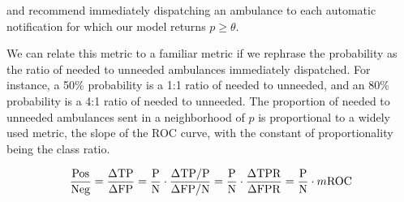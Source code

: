 \noindent and recommend immediately dispatching an ambulance to each automatic notification for which our model returns $p \ge \theta$.

We can relate this metric to a familiar metric if we rephrase the probability as the ratio of needed to unneeded ambulances immediately dispatched.  For instance, a 50\% probability is a 1:1 ratio of needed to unneeded, and an 80\% probability is a 4:1 ratio of needed to unneeded.  
The proportion of needed to unneeded ambulances sent in a neighborhood of $p$ is proportional to a widely used metric, the slope of the ROC curve, with the constant of proportionality being the class ratio.  

\begin{equation} \label{eq:ROC_slope}\hfil
\frac{\text{Pos}}{\text{Neg}}
=\frac{\Delta\text{TP}}{\Delta \text{FP}}
=\frac{\text{P}}{\text{N}} \cdot \frac{\Delta\text{TP}/\text{P}}{\Delta \text{FP}/\text{N}} 
=\frac{\text{P}}{\text{N}} \cdot \frac{\Delta\text{TPR}}{\Delta \text{FPR}}
=\frac{\text{P}}{\text{N}} \cdot m\text{ROC}
\end{equation}





